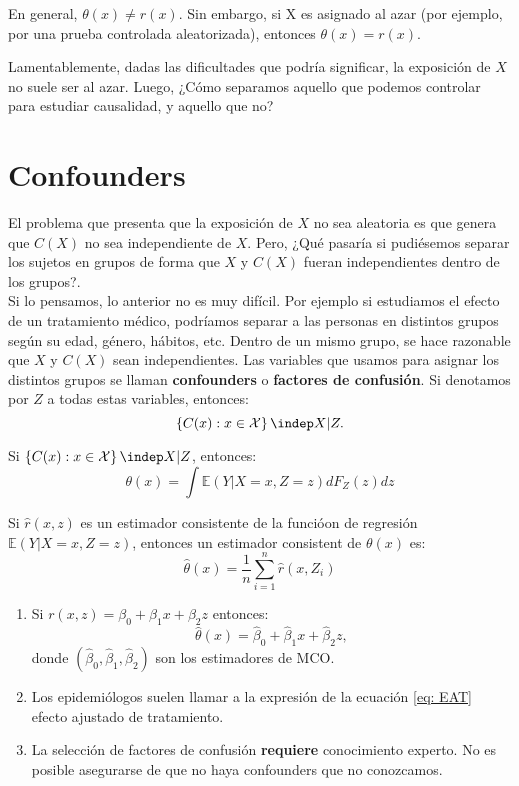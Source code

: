 \theorem En general, $\theta(x) \not = r(x)$. Sin embargo, si X es asignado al azar (por ejemplo, por una prueba controlada aleatorizada), entonces $\theta(x)=r(x)$. 

Lamentablemente, dadas las dificultades que podría significar, la exposición de $X$ no suele ser al azar. Luego, ¿Cómo separamos aquello que podemos controlar para estudiar causalidad, y aquello que no?

\section{Confounders}

El problema que presenta que la exposición de $X$ no sea aleatoria es que genera que $C(X)$ no sea independiente de $X$. Pero, ¿Qué pasaría si pudiésemos separar los sujetos en grupos de forma que $X$ y $C(X)$ fueran independientes dentro de los grupos?.\\
Si lo pensamos, lo anterior no es muy difícil. Por ejemplo si estudiamos el efecto de un tratamiento médico, podríamos separar a las personas en distintos grupos según su edad, género, hábitos, etc. Dentro de un mismo grupo, se hace razonable que $X$ y $C(X)$ sean independientes. Las variables que usamos para asignar los distintos grupos se llaman \textbf{confounders} o \textbf{factores de confusión}. Si denotamos por $Z$ a todas estas variables, entonces: 
$$
\left \{ C(x): x \in \mathcal{X} \right \} \indep X |Z.
$$

\theorem Si $\left \{C(x): x \in \mathcal{X} \right \} \indep X |Z $, entonces: 
\begin{equation}
    \theta(x)= \int \mathbb{E}(Y | X=x,Z=z) dF_{Z}(z)dz
\end{equation}

Si $\hat{r}(x,z)$ es un estimador consistente de la funcióon de regresión $\mathbb{E}(Y|X=x,Z=z)$, entonces un estimador consistent de $\theta(x)$ es: 
\begin{equation}
    \hat{\theta}(x)= \dfrac{1}{n} \sum_{i=1}^{n} \hat{r}(x,Z_i)
    \label{eq: EAT}
\end{equation}

\begin{remark}
\begin{enumerate}
    \item Si $r(x,z)=\beta_0 + \beta_1 x + \beta_2 z$ entonces: 
    $$
    \hat{\theta}(x)= \hat{\beta}_0 + \hat{\beta}_1 x + \hat{\beta}_2 z,
    $$
    donde $(\hat{\beta}_0, \hat{\beta}_1, \hat{\beta}_2)$ son los estimadores de MCO. 
    \item Los epidemiólogos suelen llamar a la expresión de la ecuación \ref{eq: EAT} efecto ajustado de tratamiento. 
    \item La selección de factores de confusión \textbf{requiere} conocimiento experto. No es posible asegurarse de que no haya confounders que no conozcamos. 
    
\end{enumerate}
\end{remark}

